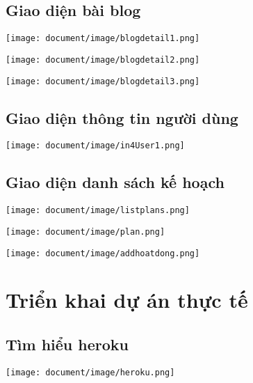 \subsection{Giao diện bài blog}
\begin{center}
    \texttt{[image: document/image/blogdetail1.png]}
\end{center}
\clearpage
\begin{center}
    \texttt{[image: document/image/blogdetail2.png]}
\end{center}
\clearpage
\begin{center}
  \captionsetup{type=figure}
  \texttt{[image: document/image/blogdetail3.png]}
\end{center}
\clearpage

\subsection{Giao diện thông tin người dùng}
\begin{center}
    \captionsetup{type=figure}  
    \texttt{[image: document/image/in4User1.png]}
\end{center}


\subsection{Giao diện danh sách kế hoạch}
\begin{center}
    \captionsetup{type=figure}  
    \texttt{[image: document/image/listplans.png]}
\end{center}

\begin{center}
    \captionsetup{type=figure}  
    \texttt{[image: document/image/plan.png]}
\end{center}
\clearpage
\begin{center}
    \captionsetup{type=figure}  
    \texttt{[image: document/image/addhoatdong.png]}
\end{center}

\clearpage
\section{Triển khai dự án thực tế}
\subsection{Tìm hiểu heroku}
\begin{center}
    \captionsetup{type=figure}  
    \texttt{[image: document/image/heroku.png]}
\end{center}

